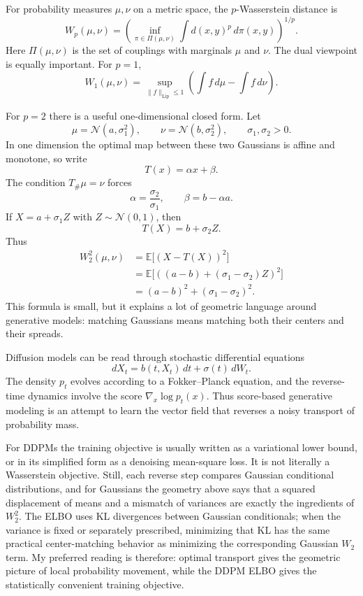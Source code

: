 For probability measures $\mu,\nu$ on a metric space, the $p$-Wasserstein distance is
\[
  W_p(\mu,\nu)=\left(\inf_{\pi\in \Pi(\mu,\nu)}\int d(x,y)^p\,d\pi(x,y)\right)^{1/p}.
\]
Here $\Pi(\mu,\nu)$ is the set of couplings with marginals $\mu$ and $\nu$.  The dual viewpoint is equally important.  For $p=1$,
\[
  W_1(\mu,\nu)=\sup_{\|f\|_{\mathrm{Lip}}\le1}\left(\int f\,d\mu-\int f\,d\nu\right).
\]

For \(p=2\) there is a useful one-dimensional closed form.  Let
\[
  \mu=\mathcal N(a,\sigma_1^2),
  \qquad
  \nu=\mathcal N(b,\sigma_2^2),
  \qquad \sigma_1,\sigma_2>0.
\]
In one dimension the optimal map between these two Gaussians is affine and monotone, so write
\[
  T(x)=\alpha x+\beta.
\]
The condition \(T_\#\mu=\nu\) forces
\[
  \alpha=\frac{\sigma_2}{\sigma_1},
  \qquad
  \beta=b-\alpha a.
\]
If \(X=a+\sigma_1 Z\) with \(Z\sim\mathcal N(0,1)\), then
\[
  T(X)=b+\sigma_2 Z.
\]
Thus
\[
\begin{aligned}
  W_2^2(\mu,\nu)
  &=\mathbb E\bigl[(X-T(X))^2\bigr]\\
  &=\mathbb E\bigl[((a-b)+(\sigma_1-\sigma_2)Z)^2\bigr]\\
  &=(a-b)^2+(\sigma_1-\sigma_2)^2.
\end{aligned}
\]
This formula is small, but it explains a lot of geometric language around generative models: matching Gaussians means matching both their centers and their spreads.

Diffusion models can be read through stochastic differential equations
\[
  dX_t=b(t,X_t)\,dt+\sigma(t)\,dW_t.
\]
The density $p_t$ evolves according to a Fokker--Planck equation, and the reverse-time dynamics involve the score $\nabla_x\log p_t(x)$.  Thus score-based generative modeling is an attempt to learn the vector field that reverses a noisy transport of probability mass.

For DDPMs the training objective is usually written as a variational lower bound, or in its simplified form as a denoising mean-square loss.  It is not literally a Wasserstein objective.  Still, each reverse step compares Gaussian conditional distributions, and for Gaussians the geometry above says that a squared displacement of means and a mismatch of variances are exactly the ingredients of \(W_2^2\).  The ELBO uses KL divergences between Gaussian conditionals; when the variance is fixed or separately prescribed, minimizing that KL has the same practical center-matching behavior as minimizing the corresponding Gaussian \(W_2\) term.  My preferred reading is therefore: optimal transport gives the geometric picture of local probability movement, while the DDPM ELBO gives the statistically convenient training objective.

